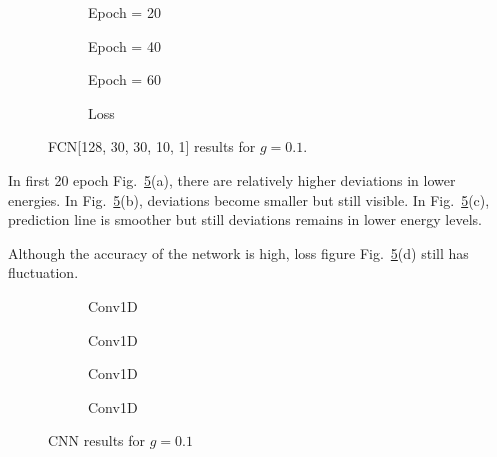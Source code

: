 \documentclass[a4paper,times,12pt]{article}
\begin{document}
\begin{figure}[H]
    \centering
    \begin{subfigure}[t]{0.45\textwidth}
		\centering
        
        \caption{Epoch = 20}
		\label{fig:a}
    \end{subfigure}
    \begin{subfigure}[t]{0.45\textwidth}
		\centering
        
        \caption{Epoch = 40}
		\label{fig:b}
    \end{subfigure}    
    \begin{subfigure}[t]{0.45\textwidth}
        \centering
        
        \caption{Epoch = 60}
		\label{fig:c}
    \end{subfigure}
    \begin{subfigure}[t]{0.45\textwidth}
        \centering
        
        \caption{Loss}
		\label{fig:c}
    \end{subfigure}
	\caption{FCN[128, 30, 30, 10, 1] results for $g = 0.1$.}
\label{fig:FFN-g-0.1}
\end{figure}

In first 20 epoch Fig.~\ref{fig:FFN-g-0.1}(a), there are relatively higher deviations in lower energies. In Fig.~\ref{fig:FFN-g-0.1}(b), deviations become smaller but still visible. In Fig.~\ref{fig:FFN-g-0.1}(c), prediction line is smoother but still deviations remains in lower energy levels.

Although the accuracy of the network is high, loss figure Fig.~\ref{fig:FFN-g-0.1}(d) still has fluctuation.

\begin{figure}[H]
    \centering
    \begin{subfigure}[t]{0.45\textwidth}
		\centering
        
        \caption{Conv1D}
		\label{fig:a}
    \end{subfigure}
    \begin{subfigure}[t]{0.45\textwidth}
		\centering
        
        \caption{Conv1D}
		\label{fig:b}
    \end{subfigure}    
    \begin{subfigure}[t]{0.45\textwidth}
        \centering
        
        \caption{Conv1D}
		\label{fig:c}
    \end{subfigure}
    \begin{subfigure}[t]{0.45\textwidth}
        \centering
        
        \caption{Conv1D}
		\label{fig:c}
    \end{subfigure}
	\caption{CNN results for $g = 0.1$}
\label{fig:CNN-g-0.1}
\end{figure}
\end{document}
